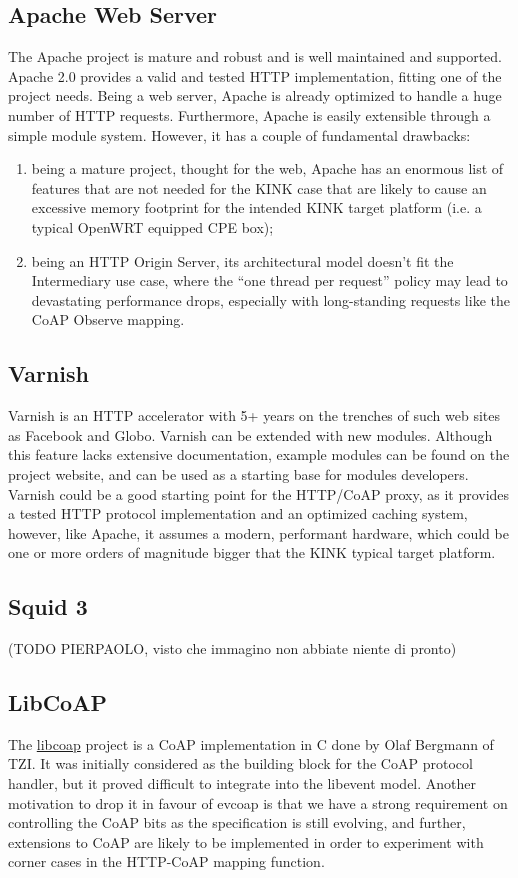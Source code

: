 \subsection{Apache Web Server}
The Apache project is mature and robust and is well maintained and supported. Apache 2.0 provides a valid and tested HTTP implementation, fitting one of the project needs.  Being a web server, Apache is already optimized to handle a huge number of HTTP requests.  Furthermore, Apache is easily extensible through a simple module system.  However, it has a couple of fundamental drawbacks:
\begin{enumerate}
\item being a mature project, thought for the web, Apache has an enormous list of features that are not needed for the KINK case that are likely to cause an excessive memory footprint for the intended KINK target platform (i.e. a typical OpenWRT equipped CPE box);
\item being an HTTP Origin Server, its architectural model doesn't fit the Intermediary use case, where the ``one thread per request'' policy may lead to devastating performance drops, especially with long-standing requests like the CoAP Observe mapping.
\end{enumerate}

\subsection{Varnish}
Varnish is an HTTP accelerator with 5+ years on the trenches of such web sites as Facebook and Globo.  Varnish can be extended with new modules. Although this feature lacks extensive documentation, example modules can be found on the project website, and can be used as a starting base for modules developers.
Varnish could be a good starting point for the HTTP/CoAP proxy, as it provides a tested HTTP protocol implementation and an optimized caching system, however, like Apache, it assumes a modern, performant hardware, which could be one or more orders of magnitude bigger that the KINK typical target platform.

\subsection{Squid 3}

(TODO PIERPAOLO, visto che immagino non abbiate niente di pronto)

\subsection{LibCoAP}
The \href{http://sourceforge.net/projects/libcoap}{libcoap} project is a CoAP implementation in C done by Olaf Bergmann of TZI.
It was initially considered as the building block for the CoAP protocol handler, but it proved difficult to integrate into the libevent model.  Another motivation to drop it in favour of evcoap is that we have a strong requirement on controlling the CoAP bits as the specification is still evolving, and further, extensions to CoAP are likely to be implemented in order to experiment with corner cases in the HTTP-CoAP mapping function.

